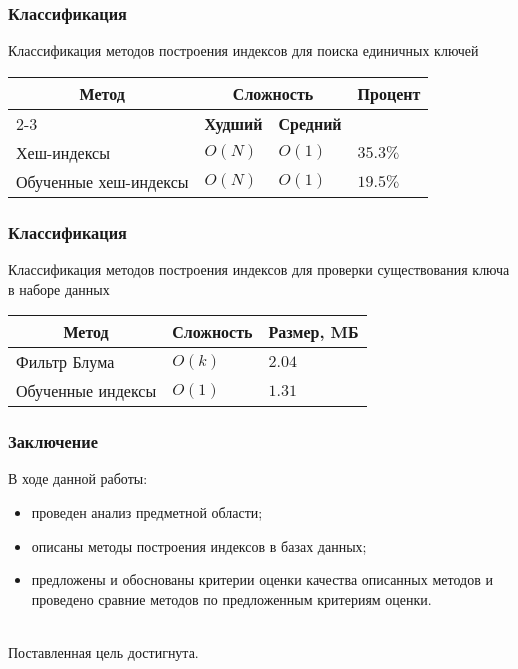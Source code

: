 \documentclass{bmstu-pr}
\begin{document}
\begin{frame}
    \frametitle{Классификация}
Классификация методов построения индексов для поиска единичных
ключей
{
\captionsetup{format=hang,justification=raggedleft,
              singlelinecheck=off,width=13.3cm}
\begin{longtable}[Hc]{|p{6.5cm}|p{2cm}|p{2cm}|p{4.8cm}|}
    \hline
    \multicolumn{1}{|c|}{\multirow{2}{*}{\textbf{Метод}}} &
    \multicolumn{2}{c|}{\textbf{Сложность}} &
    \multicolumn{1}{c|}{\multirow{2}{*}{\parbox{4.8cm}{\textbf{Процент}}}}\\
    \cline{2-3}
    & \multicolumn{1}{c|}{\textbf{Худший}}
    & \multicolumn{1}{c|}{\textbf{Средний}}
    &\\
    \hline
    Хеш-индексы
    & $O(N)$
    & $O(1)$
    & $35.3\%$\\
    \hline
    Обученные хеш-индексы
    & $O(N)$
    & $O(1)$
    & $19.5\%$\\
    \hline
\end{longtable}
}
\end{frame}

\begin{frame}
    \frametitle{Классификация}
Классификация методов построения индексов для проверки существования
ключа в наборе данных
{
\captionsetup{format=hang,justification=raggedleft,
              singlelinecheck=off,width=12cm}
\begin{longtable}[Hc]{|p{8cm}|p{2cm}|p{2cm}|}
    \hline
    \multicolumn{1}{|c|}{\textbf{Метод}} &
    \multicolumn{1}{c|}{\textbf{Сложность}} &
    \multicolumn{1}{c|}{\textbf{Размер, MБ}}\\
    \hline
    Фильтр Блума
    & $O(k)$
    & $2.04$\\
    \hline
    Обученные индексы
    & $O(1)$
    & $1.31$\\
    \hline
\end{longtable}
}
\end{frame}

\begin{frame}
    \frametitle{Заключение}
    В ходе данной работы:
    \begin{itemize}
        \item проведен анализ предметной области;
        \item описаны методы построения индексов в базах данных;
        \item предложены и обоснованы критерии оценки качества описанных методов
          и проведено сравние методов по предложенным критериям оценки.
    \end{itemize}
    ~\\

    Поставленная цель достигнута.
\end{frame}
\end{document}

